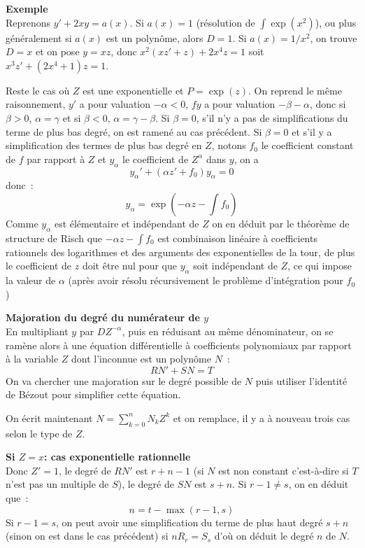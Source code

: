 \documentclass[a4paper,11pt]{article}
\begin{document}
{\bf Exemple}\\
Reprenons $y'+2xy=a(x)$. Si $a(x)=1$ (résolution de $\int \exp(x^2)$),
ou plus généralement si $a(x)$ est un polynôme,
alors $D=1$. Si $a(x)=1/x^2$, on trouve $D=x$ et on pose $y=xz$,
donc $x^2(xz'+z)+2x^4z=1$ soit $x^3z'+(2x^4+1)z=1$.

Reste le cas o\`u $Z$ est une exponentielle et $P=\exp(z)$. On reprend
le m\^eme raisonnement, $y'$ a pour valuation $-\alpha<0$, $fy$ a pour
valuation $-\beta-\alpha$, donc si $\beta > 0$,
$\alpha=\gamma$ et si $\beta<0$, $\alpha=\gamma-\beta$.
Si $\beta=0$, s'il n'y a pas de simplifications du terme de plus bas
degr\'e, on est ramen\'e au cas pr\'ec\'edent. 
Si $\beta=0$ et s'il y a simplification des termes de plus
bas degr\'e en $Z$, notons $f_0$ le coefficient constant de $f$ 
par rapport \`a $Z$ et $y_{\alpha}$ le coefficient de $Z^{\alpha}$
dans $y$, on a 
\[ y_\alpha ' + (\alpha z' + f_0) y_\alpha =0 \]
donc~:
\[ y_\alpha= \exp(-\alpha z-\int f_0)\]
Comme $y_\alpha$ est \'el\'ementaire et ind\'ependant de $Z$
on en d\'eduit par le th\'eor\`eme de structure de Risch
que $-\alpha z -\int f_0$ est combinaison lin\'eaire \`a coefficients
rationnels des logarithmes et des arguments des exponentielles de la tour,
de plus le coefficient de $z$ doit \^etre nul pour que $y_\alpha$ soit
ind\'ependant de $Z$, ce qui impose la valeur de $\alpha$ (apr\`es avoir
r\'esolu r\'ecursivement le probl\`eme d'int\'egration pour $f_0$)

{\bf Majoration du degr\'e du num\'erateur de $y$}\\
En multipliant $y$ par $D Z^{-\alpha}$, puis en réduisant au
même dénominateur,
on se ram\`ene alors à une équation différentielle à coefficients
polynomiaux par rapport \`a la variable $Z$ dont l'inconnue est un polynôme 
$N$~:
\begin{equation} \label{eq:rischdepol}
 R N' + S N = T
\end{equation}
On va chercher une majoration sur le degr\'e possible de $N$ puis
utiliser l'identit\'e de B\'ezout pour simplifier
cette \'equation. 

On \'ecrit maintenant $N=\sum_{k=0}^n N_k Z^k$ et on remplace, 
il y a \`a nouveau trois cas selon le type de $Z$.

{\bf Si $Z=x$: cas exponentielle rationnelle}\\
Donc $Z'=1$, le degré de $RN'$ est $r+n-1$ (si $N$ est non constant
c'est-à-dire si $T$ n'est pas un multiple de $S$), le degré de
$SN$ est $s+n$. Si $r-1\neq s$, on en déduit que~:
\[ n=t-\max(r-1,s)\]
Si $r-1=s$, on peut avoir
une simplification du terme de plus haut degré $s+n$ (sinon
on est dans le cas précédent) si $n R_r =S_s $
d'où on déduit le degré $n$ de $N$.
\end{document}
